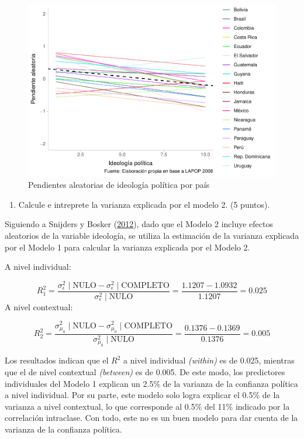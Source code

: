 \documentclass[
  12pt,
  a4paper,
]{article}
\providecommand{\tightlist}{%
  \setlength{\itemsep}{0pt}\setlength{\parskip}{0pt}}
\begin{document}
\begin{figure}

{\centering \includegraphics[width=0.8\linewidth]{01-guia_files/figure-latex/fig2-1} 

}

\caption{Pendientes aleatorias de ideología política por país}\label{fig:fig2}
\end{figure}

\begin{enumerate}
\def\labelenumi{\alph{enumi})}
\setcounter{enumi}{4}
\tightlist
\item
  Calcule e intreprete la varianza explicada por el modelo 2. (5 puntos).
\end{enumerate}

Siguiendo a Snijders y Bosker (\protect\hyperlink{ref-snijders_multilevel_2012}{2012}), dado que el Modelo 2 incluye efectos aleatorios de la variable ideología, se utiliza la estimación de la varianza explicada por el Modelo 1 para calcular la varianza explicada por el Modelo 2.

A nivel individual:

\[
R^2_1 = \frac{\sigma^2_{\epsilon}\mid\text{NULO} - \sigma^2_{\epsilon}\mid\text{COMPLETO}}{\sigma^2_{\epsilon}\mid\text{NULO}} = \frac{1.1207 - 1.0932}{1.1207} = 0.025
\]
A nivel contextual:

\[
R^2_2 = \frac{\sigma^2_{\mu_0}\mid\text{NULO} - \sigma^2_{\mu_0}\mid\text{COMPLETO}}{\sigma^2_{\mu_0}\mid\text{NULO}} = \frac{0.1376-0.1369}{0.1376} = 0.005
\]

Los resultados indican que el \(R^2\) a nivel individual \emph{(within)} es de 0.025, mientras que el de nivel contextual \emph{(between)} es de 0.005. De este modo, los predictores individuales del Modelo 1 explican un 2.5\% de la varianza de la confianza política a nivel individual. Por su parte, este modelo solo logra explicar el 0.5\% de la varianza a nivel contextual, lo que corresponde al 0.5\% del 11\% indicado por la correlación intraclase. Con todo, este no es un buen modelo para dar cuenta de la varianza de la confianza política.
\end{document}
